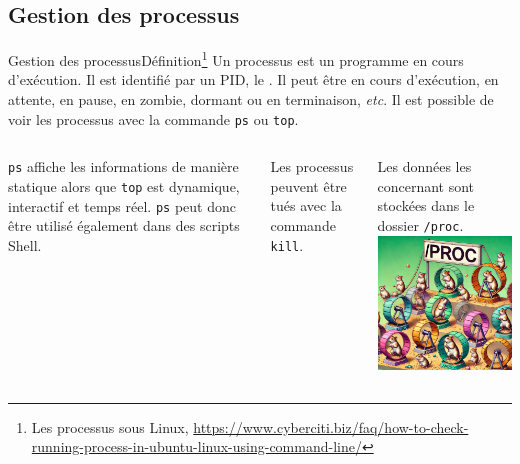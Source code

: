 \documentclass{beamer}
\begin{document}
    \subsection{Gestion des processus}\label{subsec:process-management}
    \begin{frame}{Gestion des processus}{Définition\footnote{\label{process}Les processus sous Linux, \url{https://www.cyberciti.biz/faq/how-to-check-running-process-in-ubuntu-linux-using-command-line/}}}
        Un processus est un programme en cours d'exécution.
        Il est identifié par un PID, le .
        \bigbreak
        Il peut être en cours d'exécution, en attente, en pause, en zombie, dormant ou en terminaison, \textit{etc}.
        Il est possible de voir les processus avec la commande \lstinline{ps} ou \lstinline{top}.
        \bigbreak
        \begin{columns}
            \lstinline{ps} affiche les informations de manière statique alors que \lstinline{top} est dynamique, interactif et temps réel.
            \lstinline{ps} peut donc être utilisé également dans des scripts Shell.

            Les processus peuvent être tués avec la commande \lstinline{kill}.

            Les données les concernant sont stockées dans le dossier \lstinline{/proc}.
            \centering
            \includegraphics[width=4cm]{image/proc-hamster}
        \end{columns}
    \end{frame}
\end{document}
